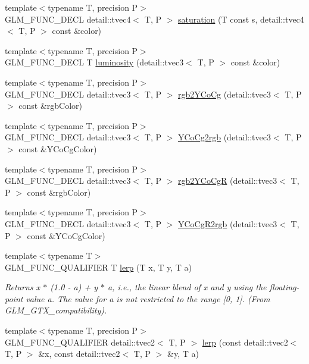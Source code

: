 \begin{CompactItemize}
\item 
{\footnotesize template$<$typename T, precision P$>$ }\\GLM\_\-FUNC\_\-DECL detail::tvec4$<$ T, P $>$ \hyperlink{group__gtx__color__space_g1ab05270ac2afa8e67b0d268e5c92573}{saturation} (T const s, detail::tvec4$<$ T, P $>$ const \&color)
\item 
{\footnotesize template$<$typename T, precision P$>$ }\\GLM\_\-FUNC\_\-DECL T \hyperlink{group__gtx__color__space_gdd1c8feae48a4fcf9e575648b25b914f}{luminosity} (detail::tvec3$<$ T, P $>$ const \&color)
\item 
{\footnotesize template$<$typename T, precision P$>$ }\\GLM\_\-FUNC\_\-DECL detail::tvec3$<$ T, P $>$ \hyperlink{group__gtx__color__space___y_co_cg_gfd5ca4a311e055d522c031650e528b02}{rgb2YCoCg} (detail::tvec3$<$ T, P $>$ const \&rgbColor)
\item 
{\footnotesize template$<$typename T, precision P$>$ }\\GLM\_\-FUNC\_\-DECL detail::tvec3$<$ T, P $>$ \hyperlink{group__gtx__color__space___y_co_cg_g68b8a9930f61718c6e819245e04f52a1}{YCoCg2rgb} (detail::tvec3$<$ T, P $>$ const \&YCoCgColor)
\item 
{\footnotesize template$<$typename T, precision P$>$ }\\GLM\_\-FUNC\_\-DECL detail::tvec3$<$ T, P $>$ \hyperlink{group__gtx__color__space___y_co_cg_gda2dcb113c669093c7099dc58f26fb7c}{rgb2YCoCgR} (detail::tvec3$<$ T, P $>$ const \&rgbColor)
\item 
{\footnotesize template$<$typename T, precision P$>$ }\\GLM\_\-FUNC\_\-DECL detail::tvec3$<$ T, P $>$ \hyperlink{group__gtx__color__space___y_co_cg_gecf0b1d1103554b9ec4e274f8284f7ad}{YCoCgR2rgb} (detail::tvec3$<$ T, P $>$ const \&YCoCgColor)
\item 
\hypertarget{group__gtx__compatibility_gaa6c29517f08a1b486b87e5da419af32}{
{\footnotesize template$<$typename T$>$ }\\GLM\_\-FUNC\_\-QUALIFIER T \hyperlink{group__gtx__compatibility_gaa6c29517f08a1b486b87e5da419af32}{lerp} (T x, T y, T a)}
\label{group__gtx__compatibility_gaa6c29517f08a1b486b87e5da419af32}

\begin{CompactList}\small\item\em Returns x $\ast$ (1.0 - a) + y $\ast$ a, i.e., the linear blend of x and y using the floating-point value a. The value for a is not restricted to the range \mbox{[}0, 1\mbox{]}. (From GLM\_\-GTX\_\-compatibility). \item\end{CompactList}\item 
\hypertarget{group__gtx__compatibility_gce46313a3fdfc63383d8eba84a17251a}{
{\footnotesize template$<$typename T, precision P$>$ }\\GLM\_\-FUNC\_\-QUALIFIER detail::tvec2$<$ T, P $>$ \hyperlink{group__gtx__compatibility_gce46313a3fdfc63383d8eba84a17251a}{lerp} (const detail::tvec2$<$ T, P $>$ \&x, const detail::tvec2$<$ T, P $>$ \&y, T a)}
\label{group__gtx__compatibility_gce46313a3fdfc63383d8eba84a17251a}


\end{CompactItemize}
